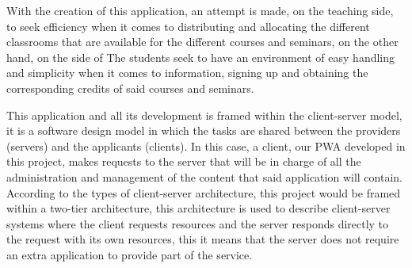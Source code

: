 \documentclass[a4paper, 12pt]{book}
\begin{document}
	With the creation of this application, an attempt is made, on the teaching side, to seek efficiency when it comes to distributing and allocating the different classrooms that are available for the different courses and seminars, on the other hand, on the side of The students seek to have an environment of easy handling and simplicity when it comes to information, signing up and obtaining the corresponding credits of said courses and seminars.


	This application and all its development is framed within the client-server model, it is a software design model in which the tasks are shared between the providers (servers) and the applicants (clients). In this case, a client, our PWA developed in this project, makes requests to the server that will be in charge of all the administration and management of the content that said application will contain. According to the types of client-server architecture, this project would be framed within a two-tier architecture, this architecture is used to describe client-server systems where the client requests resources and the server responds directly to the request with its own resources, this it means that the server does not require an extra application to provide part of the service.
	
%	
\end{document}
